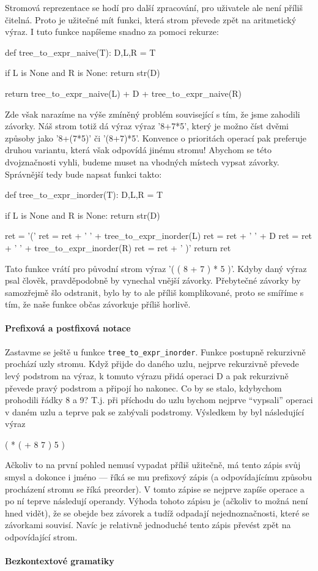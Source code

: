 Stromová reprezentace se hodí pro další zpracování, pro uživatele ale není 
příliš čitelná. Proto je užitečné mít funkci, která strom převede zpět na
aritmetický výraz. I tuto funkce napíšeme snadno za pomoci rekurze:

\begin{python}
def tree_to_expr_naive(T):
    D,L,R = T
    
    if L is None and R is None:
        return str(D)
    
    return tree_to_expr_naive(L) + D + tree_to_expr_naive(R)
\end{python}

Zde však narazíme na výše zmíněný problém související s tím, že jsme zahodili 
závorky. Náš strom totiž dá výraz výraz '8+7*5', který je možno číst dvěmi
způsoby jako '8+(7*5)' či '(8+7)*5'. Konvence o prioritách operací pak preferuje
druhou variantu, která však odpovídá jinému stromu! Abychom se této dvojznačnosti
vyhli, budeme muset na vhodných místech vypsat závorky. Správnější tedy
bude napsat funkci takto:

\begin{python}
def tree_to_expr_inorder(T):
    D,L,R = T
    
    if L is None and R is None:
        return str(D)
    
    ret = '('
    ret = ret + ' ' + tree_to_expr_inorder(L)
    ret = ret + ' ' + D
    ret = ret + ' ' + tree_to_expr_inorder(R)
    ret = ret + ' )'
    return ret
\end{python}

Tato funkce vrátí pro původní strom výraz '( ( 8 + 7 ) * 5 )'. Kdyby daný výraz psal
člověk, pravděpodobně by vynechal vnější závorky. Přebytečné závorky by samozřejmě
šlo odstranit, bylo by to ale příliš komplikované, proto se smíříme s tím, že
naše funkce občas závorkuje příliš horlivě. 

\paragraph{Prefixová a postfixová notace} Zastavme se ještě u funkce
{\tt tree\_to\_expr\_inorder}. Funkce postupně rekurzivně prochází uzly stromu.
Když přijde do daného uzlu, nejprve rekurzivně převede levý podstrom na výraz,
k tomuto výrazu přidá operaci D a pak rekurzivně převede pravý podstrom a připojí
ho nakonec. Co by se stalo, kdybychom prohodili řádky 8 a 9?  T.j. při příchodu
do uzlu bychom nejprve ``vypsali'' operaci v daném uzlu a teprve pak se zabývali
podstromy. Výsledkem by byl následující výraz
\begin{center}
 ( * ( + 8 7 ) 5 )
\end{center}
Ačkoliv to na první pohled nemusí vypadat příliš užitečně, má tento zápis
svůj smysl a dokonce i jméno --- říká se mu prefixový zápis (a odpovídajícímu 
způsobu procházení stromu se říká preorder). V tomto zápise se nejprve zapíše
operace a po ní teprve následují operandy. Výhoda tohoto zápisu je (ačkoliv to možná
není hned vidět), že se obejde bez závorek a tudíž odpadají nejednoznačnosti, 
které se závorkami souvisí. Navíc je relativně jednoduché tento zápis převést
zpět na odpovídající strom. 


\paragraph{Bezkontextové gramatiky}

\ifx\ucebnice\undefined

\fi
